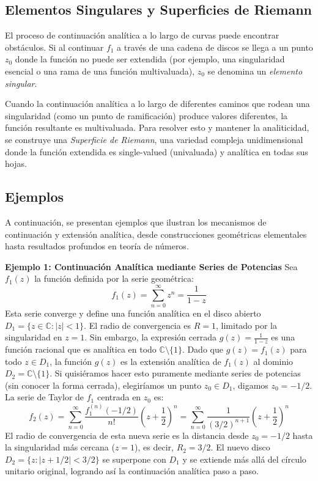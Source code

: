 \documentclass[a4paper]{article}
\begin{document}
\subsection*{Elementos Singulares y Superficies de Riemann}
El proceso de continuación analítica a lo largo de curvas puede encontrar obstáculos. Si al continuar $f_1$ a través de una cadena de discos se llega a un punto $z_0$ donde la función no puede ser extendida (por ejemplo, una singularidad esencial o una rama de una función multivaluada), $z_0$ se denomina un \textit{elemento singular}. 

Cuando la continuación analítica a lo largo de diferentes caminos que rodean una singularidad (como un punto de ramificación) produce valores diferentes, la función resultante es multivaluada. Para resolver esto y mantener la analiticidad, se construye una \textit{Superficie de Riemann}, una variedad compleja unidimensional donde la función extendida es single-valued (univaluada) y analítica en todas sus hojas.

\subsection{Ejemplos}

A continuación, se presentan ejemplos que ilustran los mecanismos de continuación y extensión analítica, desde construcciones geométricas elementales hasta resultados profundos en teoría de números.

\textbf{Ejemplo 1: Continuación Analítica mediante Series de Potencias}
Sea $f_1(z)$ la función definida por la serie geométrica:
$$ f_1(z) = \sum_{n=0}^{\infty} z^n = \frac{1}{1-z} $$
Esta serie converge y define una función analítica en el disco abierto $D_1 = \{z \in \mathbb{C} : |z| < 1\}$. El radio de convergencia es $R=1$, limitado por la singularidad en $z=1$.
Sin embargo, la expresión cerrada $g(z) = \frac{1}{1-z}$ es una función racional que es analítica en todo $\mathbb{C} \setminus \{1\}$. Dado que $g(z) = f_1(z)$ para todo $z \in D_1$, la función $g(z)$ es la extensión analítica de $f_1(z)$ al dominio $D_2 = \mathbb{C} \setminus \{1\}$. 
Si quisiéramos hacer esto puramente mediante series de potencias (sin conocer la forma cerrada), elegiríamos un punto $z_0 \in D_1$, digamos $z_0 = -1/2$. La serie de Taylor de $f_1$ centrada en $z_0$ es:
$$ f_2(z) = \sum_{n=0}^{\infty} \frac{f_1^{(n)}(-1/2)}{n!} \left(z + \frac{1}{2}\right)^n = \sum_{n=0}^{\infty} \frac{1}{(3/2)^{n+1}} \left(z + \frac{1}{2}\right)^n $$
El radio de convergencia de esta nueva serie es la distancia desde $z_0 = -1/2$ hasta la singularidad más cercana ($z=1$), es decir, $R_2 = 3/2$. El nuevo disco $D_2 = \{z : |z + 1/2| < 3/2\}$ se superpone con $D_1$ y se extiende más allá del círculo unitario original, logrando así la continuación analítica paso a paso.
\end{document}
